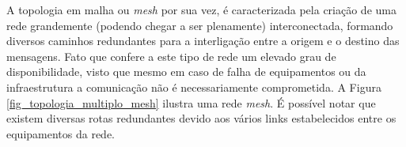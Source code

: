 A topologia em malha ou \emph{mesh} por sua vez, é caracterizada pela criação de uma rede grandemente (podendo chegar a ser plenamente) interconectada, formando diversos caminhos redundantes para a interligação entre a origem e o destino das mensagens. Fato que confere a este tipo de rede um elevado grau de disponibilidade, visto que mesmo em caso de falha de equipamentos ou da infraestrutura a comunicação não é necessariamente comprometida. A Figura \ref{fig_topologia_multiplo_mesh} ilustra uma rede \emph{mesh}. É possível notar que existem diversas rotas redundantes devido aos vários links estabelecidos entre os equipamentos da rede.


